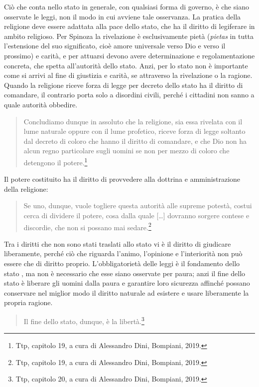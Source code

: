 Ciò che conta nello stato in generale, con qualsiasi forma di governo, è che siano osservate le leggi, non il modo in cui avviene tale osservanza. La pratica della religione deve essere adattata alla pace dello stato, che ha il diritto di legiferare in ambito religioso. Per Spinoza la rivelazione è esclusivamente pietà (\textit{pietas} in tutta l'estensione del suo significato, cioè amore universale verso Dio e verso il prossimo) e carità, e per attuarsi devono avere determinazione e regolamentazione concreta, che spetta all'autorità dello stato. Anzi, per lo stato non è importante come si arrivi al fine di giustizia e carità, se attraverso la rivelazione o la ragione. Quando la religione riceve forza di legge per decreto dello stato ha il diritto di comandare, il contrario porta solo a disordini civili, perché i cittadini non sanno a quale autorità obbedire. 

\begin{quotation}
	\small Concludiamo dunque in assoluto che la religione, sia essa rivelata con il lume naturale oppure con il lume profetico, riceve forza di legge soltanto dal decreto di coloro che hanno il diritto di comandare, e che Dio non ha alcun regno particolare sugli uomini se non per mezzo di coloro che detengono il potere.\footnote{Ttp, capitolo 19, a cura di Alessandro Dini, Bompiani, 2019.}
\end{quotation}

Il potere costituito ha il diritto di provvedere alla dottrina e amministrazione della religione:
\begin{quotation}
	\small Se uno, dunque, vuole togliere questa autorità alle supreme potestà, costui cerca di dividere il potere, cosa dalla quale [\dots] dovranno sorgere contese e discordie, che non si possano mai sedare.\footnote{Ttp, capitolo 19, a cura di Alessandro Dini, Bompiani, 2019.}
\end{quotation}

Tra i diritti che non sono stati traslati allo stato vi è il diritto di giudicare liberamente, perché ciò che riguarda l'animo, l'opinione e l'interiorità non può essere che di diritto proprio. L'obbligatorietà delle leggi è il fondamento dello stato , ma non è necessario che esse siano osservate per paura; anzi il fine dello stato è liberare gli uomini dalla paura e garantire  loro sicurezza affinché possano conservare nel miglior modo il diritto naturale ad esistere e usare liberamente la propria ragione.

\begin{quotation}
	\small Il fine dello stato, dunque, è la libertà.\footnote{Ttp, capitolo 20, a cura di Alessandro Dini, Bompiani, 2019.}
\end{quotation}

